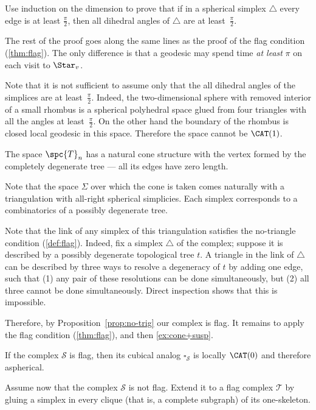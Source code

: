 Use induction on the dimension  to prove that if in a spherical simplex $\triangle$ every edge is at least $\tfrac\pi2$, then 
all dihedral angles of $\triangle$ are at least~$\tfrac\pi2$.

The rest of the proof goes along the same lines as the proof of the flag condition (\ref{thm:flag}).
The only difference is that a geodesic may spend time \emph{at least} $\pi$ on each visit to $\Star_v$.

Note that it is not sufficient to assume only that the all dihedral angles of the simplices are at least~$\tfrac\pi2$. 
Indeed, the two-dimensional sphere with removed interior of a small rhombus is a spherical polyhedral space glued from four triangles with all the angles at least~$\tfrac\pi2$.
On the other hand the boundary of the rhombus is closed local geodesic in this space.
Therefore the space cannot be $\CAT(1)$.

The space $\spc{T}_n$ has a natural cone structure with the vertex formed by the  completely degenerate tree --- all its edges have zero length.

Note that the space $\Sigma$
over which the cone is taken comes naturally with a triangulation 
with all-right spherical simplicies.
Each simplex corresponds to a combinatorics of a possibly degenerate tree.

Note that the link of any simplex of this triangulation satisfies the no-triangle condition (\ref{def:flag}).
Indeed, fix a simplex $\triangle$ of the complex;
suppose it is described by a possibly degenerate topological tree $t$.
A triangle in the link of  $\triangle$ can be described by three ways to resolve a degeneracy of $t$ by adding one edge,
such that (1) any pair of these resolutions can be done simultaneously, but (2) all three cannot be done simultaneously.
Direct inspection shows that this is impossible.

Therefore, by Proposition~\ref{prop:no-trig} our complex is flag.
It remains to apply the flag condition (\ref{thm:flag}), and then \ref{ex:cone+susp}.

If the complex $\mathcal{S}$ is flag, then its cubical analog $\square_{\mathcal{S}}$ is locally $\CAT(0)$ and therefore aspherical.

Assume now that the complex $\mathcal{S}$ is not flag. 
Extend it to a flag complex $\mathcal{T}$ by gluing a simplex in every clique (that is, a complete subgraph) of its one-skeleton.

